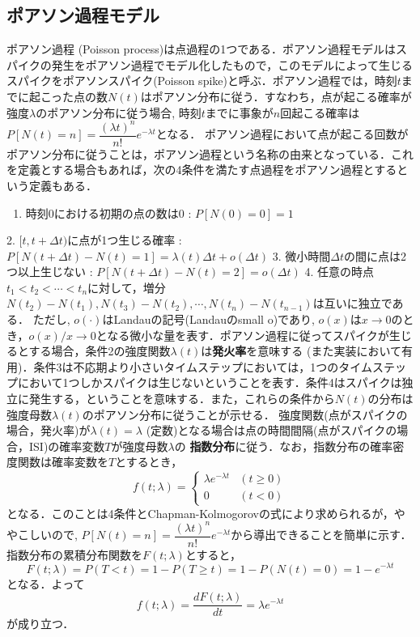\subsection{ポアソン過程モデル}
ポアソン過程 (Poisson process)は点過程の1つである．ポアソン過程モデルはスパイクの発生をポアソン過程でモデル化したもので，このモデルによって生じるスパイクをポアソンスパイク(Poisson spike)と呼ぶ．ポアソン過程では，時刻$t$までに起こった点の数$N(t)$はポアソン分布に従う．すなわち，点が起こる確率が強度$\lambda$のポアソン分布に従う場合, 時刻$t$までに事象が$n$回起こる確率は$P[N(t)=n]=\dfrac{(\lambda t)^{n}}{n !} e^{-\lambda t}$となる． 
ポアソン過程において点が起こる回数がポアソン分布に従うことは，ポアソン過程という名称の由来となっている．これを定義とする場合もあれば，次の4条件を満たす点過程をポアソン過程とするという定義もある．
\begin{enumerate}
\item 時刻0における初期の点の数は0 : $P[N(0)=0]=1$ 
\end{enumerate}
2. $[t, t+\Delta t)$に点が1つ生じる確率 : $P[N(t+\Delta t)-N(t)=1]=\lambda(t)\Delta t+o(\Delta t)$
3. 微小時間$\Delta t$の間に点は2つ以上生じない : $P[N(t+\Delta t)-N(t)=2]=o(\Delta t)$
4. 任意の時点$t_1 < t_2 < \cdots< t_n$に対して，増分 $N(t_2)-N(t_1), N(t_3)-N(t_2), \cdots, N(t_n)-N(t_{n−1})$は互いに独立である．
ただし, $o(\cdot)$はLandauの記号(Landauのsmall o)であり, $o(x)$は$x\to 0$のとき，$o(x)/x\to 0$となる微小な量を表す．ポアソン過程に従ってスパイクが生じるとする場合，条件2の強度関数$\lambda(t)$は\textbf{発火率}を意味する (また実装において有用)．条件3は不応期より小さいタイムステップにおいては，1つのタイムステップにおいて1つしかスパイクは生じないということを表す．条件4はスパイクは独立に発生する，ということを意味する．また，これらの条件から$N(t)$の分布は強度母数$\lambda(t)$のポアソン分布に従うことが示せる．
強度関数(点がスパイクの場合，発火率)が$\lambda(t)=\lambda$ (定数)となる場合は点の時間間隔(点がスパイクの場合，ISI)の確率変数$T$が強度母数$\lambda$の \textbf{指数分布}に従う．なお，指数分布の確率密度関数は確率変数を$T$とするとき，
\begin{equation}
f(t;\lambda )=\left\{{\begin{array}{ll}\lambda e^{-\lambda t}&(t\geq 0)\\0&(t<0)\end{array}}\right.
\end{equation}
となる．このことは4条件とChapman-Kolmogorovの式により求められるが，ややこしいので, $P[N(t)=n]=\dfrac{(\lambda t)^{n}}{n !} e^{-\lambda t}$から導出できることを簡単に示す．指数分布の累積分布関数を$F(t; \lambda)$とすると，
\begin{equation}
F(t; \lambda) = P(T< t)=1-P(T\geq t)=1-P(N(t)=0)=1-e^{-\lambda t}
\end{equation}
となる．よって
\begin{equation}
f(t; \lambda)=\frac{dF(t; \lambda)}{dt}=\lambda e^{-\lambda t}
\end{equation}
が成り立つ．
